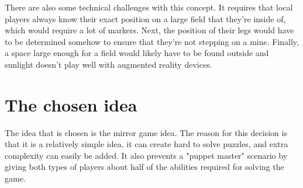 	There are also some technical challenges with this concept. It requires that
	local players always know their exact position on a large field that they're
	inside of, which would require a lot of markers. Next, the position of their
	legs would have to be determined somehow to ensure that they're not stepping
	on a mine. Finally, a space large enough for a field would likely have to be
	found outside and sunlight doesn't play well with augmented reality devices.

\section{The chosen idea}
	The idea that is chosen is the mirror game idea. The reason for this
	decision is that it is a relatively simple idea, it can create hard
	to solve puzzles, and extra complexity can easily be added. It also
	prevents a "puppet master" scenario by giving both types of players
	about half of the abilities required for solving the game.
